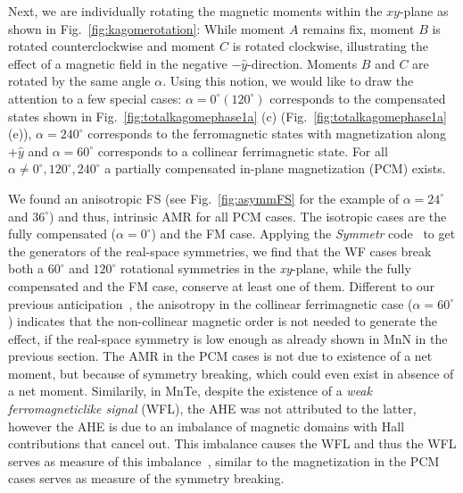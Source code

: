 \documentclass[prb,showpacs,amsmath,amssymb,superscriptaddress,twocolumn,floatfix]{revtex4-1}
\begin{document}
Next, we are individually rotating the magnetic moments
within the $xy$-plane as shown in Fig.~\ref{fig:kagomerotation}: While moment $A$ remains fix, moment $B$ is rotated counterclockwise and moment $C$ is rotated clockwise, illustrating the effect of a magnetic field in the negative $-\hat{y}$-direction. Moments $B$ and $C$ are rotated by the same angle $\alpha$. Using this notion, we would like to draw the attention to a few special cases: $\alpha = 0^\circ (120^\circ)$ corresponds to the compensated states shown in Fig.~\ref{fig:totalkagomephase1a} (c) (Fig.~\ref{fig:totalkagomephase1a} (e)), $\alpha = 240^\circ$ corresponds to the ferromagnetic states with magnetization along $+\hat{y}$ and $\alpha = 60^\circ$ corresponds to a collinear ferrimagnetic state. For all $\alpha \neq 0^\circ, 120^\circ, 240^\circ$ a partially compensated in-plane magnetization (PCM) exists. 

We found an anisotropic FS (see Fig.~\ref{fig:asymmFS} for the example of $\alpha = 24^\circ$ and $36^\circ$) and thus, intrinsic AMR for all PCM cases. The isotropic cases are the fully compensated ($\alpha = 0^\circ$) and the FM case. Applying the \textit{Symmetr} code~\cite{Symmetr} to get the generators of the real-space symmetries, we find that the WF cases break both a $60^\circ$ and $120^\circ$ rotational symmetries in the \textit{xy}-plane, while the fully compensated and the FM case, conserve at least one of them. 
Different to our previous anticipation~\cite{Ritzinger:2023}, the anisotropy in the collinear ferrimagnetic case ($\alpha = 60^\circ$) indicates that the non-collinear magnetic order is not needed to generate the effect, if the real-space symmetry is low enough as already shown in MnN in the previous section. The AMR in the PCM cases is not due to existence of a net moment, but because of symmetry breaking, which could even exist in absence of a net moment. Similarily, in MnTe, despite the existence of a \textit{weak ferromagneticlike signal} (WFL), the AHE was not attributed to the latter, however the AHE is due to an imbalance of magnetic domains with Hall contributions that cancel out. This imbalance causes the WFL and thus the WFL serves as measure of this imbalance~\cite{Kluczyk:2024}, similar to the magnetization in the PCM cases serves as measure of the symmetry breaking.
\end{document}
